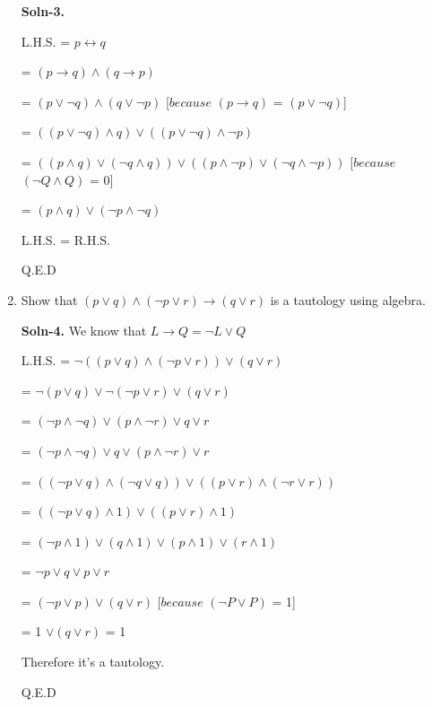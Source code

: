 \documentclass{article}
\begin{document}
\begin{enumerate}
        \textbf{Soln-3.}\par
        L.H.S. = $p \leftrightarrow q$\par
           = $(p \rightarrow q) \wedge (q \rightarrow p)$\par
           = $(p \vee \neg q) \wedge (q \vee \neg p)$ [$ because $  $(p \rightarrow q)$ = $(p \vee \neg q)$] \par
           = $((p \vee \neg q) \wedge q) \vee ((p \vee \neg q) \wedge \neg p)$\par
           = $((p \wedge q) \vee (\neg q \wedge q)) \vee ((p \wedge \neg p) \vee (\neg q \wedge \neg p))$ [$ because $  $(\neg Q \wedge Q)$ = 0] \par		
           = $(p \wedge q) \vee (\neg p \wedge \neg q)$\par
        L.H.S. = R.H.S.\par
        \begin{center}
        Q.E.D
        \end{center}
        
\item   Show that $(p \vee q) \wedge (\neg p \vee r) \rightarrow (q \vee r)$
        is a tautology using algebra.

        \textbf{Soln-4.} We know that $L \rightarrow Q  = \neg L \vee Q$ \par
        L.H.S. = $\neg ((p \vee q) \wedge (\neg p \vee r)) \vee (q \vee r)$\par
           = $\neg (p \vee q) \vee \neg (\neg p \vee r) \vee (q \vee r)$ \par
           = $(\neg p \wedge \neg q) \vee (p \wedge \neg r) \vee q \vee r $ \par
           = $(\neg p \wedge \neg q) \vee q \vee (p \wedge \neg r) \vee r$\par
           = $((\neg p \vee q) \wedge (\neg q \vee q)) \vee ((p \vee r) \wedge (\neg r \vee r))$\par
           = $((\neg p \vee q) \wedge 1) \vee ((p \vee r) \wedge 1)$\par
           = $(\neg p \wedge 1) \vee (q \wedge 1) \vee (p \wedge 1) \vee (r \wedge 1)$\par
           = $\neg p \vee q \vee p \vee r$\par
           = $(\neg p \vee p) \vee (q \vee r)$ [$ because $  $(\neg P \vee P)$ = 1] \par
           = 1 $\vee (q \vee r)$
           = 1 	
         
        Therefore it's a tautology.\par
        \begin{center}
        Q.E.D
        \end{center}


\end{enumerate}
\end{document}
